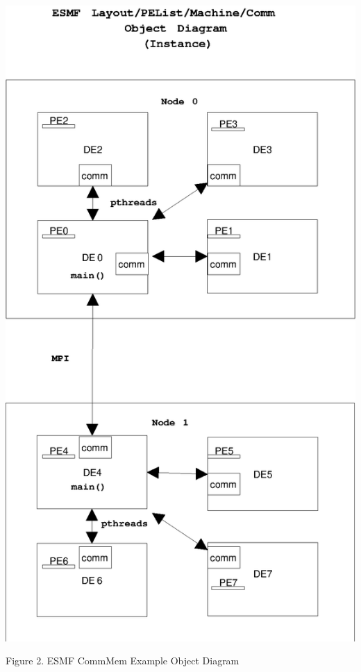 \begin{center}
\includegraphics{CommMemObject.EPS}

Figure 2.  ESMF CommMem Example Object Diagram

\end{center}

